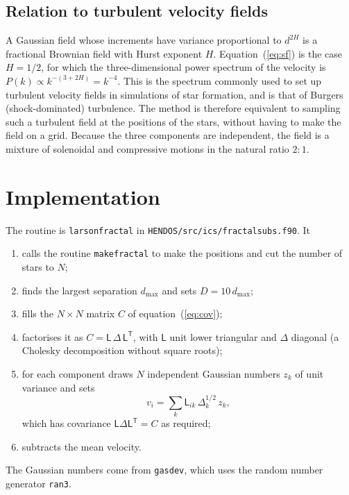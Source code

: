 \documentclass[11pt,a4paper]{article}
\begin{document}
\subsection{Relation to turbulent velocity fields}

A Gaussian field whose increments have variance proportional to
$d^{2H}$ is a fractional Brownian field with Hurst exponent $H$.
Equation~(\ref{eq:sf}) is the case $H = 1/2$, for which the
three-dimensional power spectrum of the velocity is $P(k) \propto
k^{-(3+2H)} = k^{-4}$. This is the spectrum commonly used to set up
turbulent velocity fields in simulations of star formation, and is that
of Burgers (shock-dominated) turbulence. The method is therefore
equivalent to sampling such a turbulent field at the positions of the
stars, without having to make the field on a grid. Because the three
components are independent, the field is a mixture of solenoidal and
compressive motions in the natural ratio $2:1$.

\section{Implementation}

The routine is \texttt{larsonfractal} in
\texttt{HENDOS/src/ics/fractalsubs.f90}. It
\begin{enumerate}
\item calls the routine \texttt{makefractal} to make the positions and
  cut the number of stars to $N$;
\item finds the largest separation $d_{\max}$ and sets $D =
  10\,d_{\max}$;
\item fills the $N\times N$ matrix $C$ of equation~(\ref{eq:cov});
\item factorises it as $C = \mathsf{L}\,\mathsf{\Delta}\,
  \mathsf{L}^{\mathsf T}$, with $\mathsf L$ unit lower triangular and
  $\mathsf\Delta$ diagonal (a Cholesky decomposition without square
  roots);
\item for each component draws $N$ independent Gaussian numbers $z_k$ of
  unit variance and sets
  \begin{equation}
    v_i = \sum_k \mathsf{L}_{ik}\,\Delta_k^{1/2}\,z_k ,
  \end{equation}
  which has covariance $\mathsf{L}\mathsf{\Delta}\mathsf{L}^{\mathsf T} =
  C$ as required;
\item subtracts the mean velocity.
\end{enumerate}
The Gaussian numbers come from \texttt{gasdev}, which uses the random
number generator \texttt{ran3}.
\end{document}
